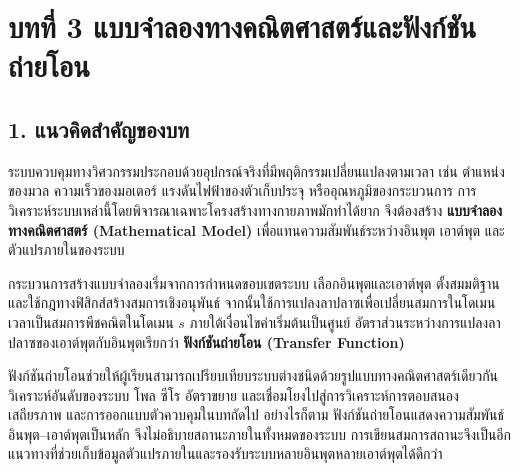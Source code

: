 \section{บทที่ 3 แบบจำลองทางคณิตศาสตร์และฟังก์ชันถ่ายโอน}




\subsection{1. แนวคิดสำคัญของบท}

ระบบควบคุมทางวิศวกรรมประกอบด้วยอุปกรณ์จริงที่มีพฤติกรรมเปลี่ยนแปลงตามเวลา เช่น ตำแหน่งของมวล ความเร็วของมอเตอร์ แรงดันไฟฟ้าของตัวเก็บประจุ หรืออุณหภูมิของกระบวนการ การวิเคราะห์ระบบเหล่านี้โดยพิจารณาเฉพาะโครงสร้างทางกายภาพมักทำได้ยาก จึงต้องสร้าง \textbf{แบบจำลองทางคณิตศาสตร์ (Mathematical Model)} เพื่อแทนความสัมพันธ์ระหว่างอินพุต เอาต์พุต และตัวแปรภายในของระบบ

กระบวนการสร้างแบบจำลองเริ่มจากการกำหนดขอบเขตระบบ เลือกอินพุตและเอาต์พุต ตั้งสมมติฐาน และใช้กฎทางฟิสิกส์สร้างสมการเชิงอนุพันธ์ จากนั้นใช้การแปลงลาปลาซเพื่อเปลี่ยนสมการในโดเมนเวลาเป็นสมการพีชคณิตในโดเมน $s$ ภายใต้เงื่อนไขค่าเริ่มต้นเป็นศูนย์ อัตราส่วนระหว่างการแปลงลาปลาซของเอาต์พุตกับอินพุตเรียกว่า \textbf{ฟังก์ชันถ่ายโอน (Transfer Function)}

ฟังก์ชันถ่ายโอนช่วยให้ผู้เรียนสามารถเปรียบเทียบระบบต่างชนิดด้วยรูปแบบทางคณิตศาสตร์เดียวกัน วิเคราะห์อันดับของระบบ โพล ซีโร อัตราขยาย และเชื่อมโยงไปสู่การวิเคราะห์การตอบสนอง เสถียรภาพ และการออกแบบตัวควบคุมในบทถัดไป อย่างไรก็ตาม ฟังก์ชันถ่ายโอนแสดงความสัมพันธ์อินพุต–เอาต์พุตเป็นหลัก จึงไม่อธิบายสถานะภายในทั้งหมดของระบบ การเขียนสมการสถานะจึงเป็นอีกแนวทางที่ช่วยเก็บข้อมูลตัวแปรภายในและรองรับระบบหลายอินพุตหลายเอาต์พุตได้ดีกว่า

